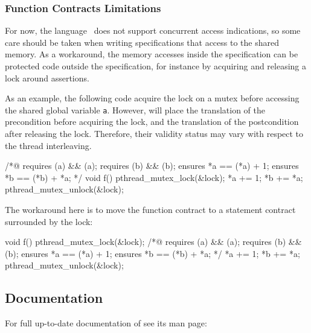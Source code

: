 \subsubsection{Function Contracts Limitations}

For now, the \eacsl language~\cite{eacsl} does not support concurrent access
indications, so some care should be taken when writing specifications that
access to the shared memory. As a workaround, the memory accesses inside the
specification can be protected code outside the specification, for instance by
acquiring and releasing a lock around \eacsl assertions.

As an example, the following code acquire the lock on a mutex before accessing
the shared global variable \texttt{a}. However, \eacsl will place the
translation of the precondition before acquiring the lock, and the translation
of the postcondition after releasing the lock. Therefore, their validity status
may vary with respect to the thread interleaving.

\begin{minipage}{\linewidth}
\begin{ccode}
/*@ requires \valid(a) && \initialized(a);
    requires \valid(b) && \initialized(b);
    ensures *a == \old(*a) + 1;
    ensures *b == \old(*b) + *a; */
void f() {
  pthread_mutex_lock(&lock);
  *a += 1;
  *b += *a;
  pthread_mutex_unlock(&lock);
}
\end{ccode}
\end{minipage}

The workaround here is to move the function contract to a statement contract
surrounded by the lock:

\begin{minipage}{\linewidth}
\begin{ccode}
void f() {
  pthread_mutex_lock(&lock);
  /*@ requires \valid(a) && \initialized(a);
      requires \valid(b) && \initialized(b);
      ensures *a == \old(*a) + 1;
      ensures *b == \old(*b) + *a; */
  {
    *a += 1;
    *b += *a;
  }
  pthread_mutex_unlock(&lock);
}
\end{ccode}
\end{minipage}

\subsection{Documentation}\label{sec:eacsl-gcc:doc}

For full up-to-date documentation of \eacslgcc see its man page:

